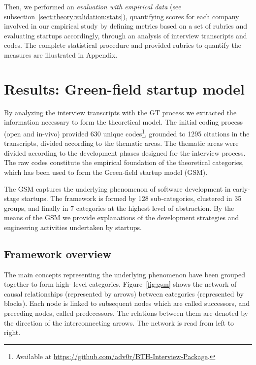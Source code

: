 \documentclass[10pt,journal,letterpaper,compsoc]{IEEEtran}
\begin{document}
Then, we performed an \textit{evaluation with empirical data} (see 
subsection~\ref{sect:theory:validation:stats}), quantifying scores for each 
company involved in our empirical study by defining metrics based on a set of 
rubrics and evaluating startups accordingly, through an analysis of interview
transcripts and codes. The complete statistical procedure and provided rubrics
to quantify the measures are illustrated in Appendix.




\section{Results: Green-field startup model}\label{res:gsm}

By analyzing the interview transcripts with the GT process we extracted the
information necessary to form the theoretical model. The initial coding process
(open and in-vivo) provided 630 unique codes\footnote{Available at
\url{https://github.com/adv0r/BTH-Interview-Package}.}, grounded to 1295
citations in the transcripts, divided according to the thematic areas. The
thematic areas were divided according to the development phases designed for the
interview process. The raw codes constitute the empirical foundation of the
theoretical categories, which has been used to form the Green-field startup
model (GSM).

The GSM captures the underlying phenomenon of software development in early-
stage startups. The framework is formed by 128 sub-categories, clustered in 35
groups, and finally in 7 categories at the highest level of abstraction. By the
means of the GSM we provide explanations of the development strategies and
engineering activities undertaken by startups.
\subsection{Framework overview} \label{res:gsm:frmov} The main concepts
representing the underlying phenomenon have been grouped together to form high-
level categories. Figure~\ref{fig:gsm} shows the network of causal
relationships (represented by arrows) between categories (represented by
blocks). Each node is linked to subsequent nodes which are called successors,
and preceding nodes, called predecessors. The relations between them are denoted
by the direction of the interconnecting arrows. The network is read from left to
right.
\end{document}
